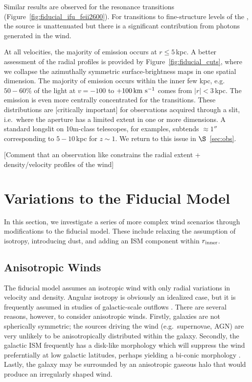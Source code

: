 \documentclass[12pt,preprint]{aastex}
\begin{document}
Similar results are observed for the  resonance
transitions (Figure~\ref{fig:fiducial_ifu_feii2600}).
For transitions to fine-structure levels of the \aconfig, the source
is unattenuated but there is a significant contribution from photons
generated in the wind. 

At all velocities, the majority of emission occurs at $r \le 5$\,kpc.
A better assessment of the radial profiles is provided by
Figure~\ref{fig:fiducial_cuts}, where we collapse the 
azimuthally symmetric surface-brightness maps in
one spatial dimension.  The majority of
 emission occurs within the inner few kpc, e.g.\ $50-60\%$
of the light at $v=-100$ to $+100 \, {\rm km~s^{-1}}$
comes from $|r| < 3$\,kpc.
The emission
is even more centrally concentrated for the  transitions.
These distributions are [critically important] for observations
acquired through a slit, i.e.\ where the aperture has a limited extent
in one or more dimensions.  A standard longslit on 10m-class
telescopes, for examples, subtends $\approx 1''$ corresponding to
$5-10$\,kpc for $z \sim 1$.    We return to this issue in
$\S$~\ref{sec:obs}. 

[Comment that an observation like constrains the radial extent +
density/velocity profiles of the wind]


\section{Variations to the Fiducial Model}

In this section, we investigate a series of more complex wind
scenarios
through modifications to the fiducial model.  These include relaxing
the assumption of isotropy, introducing dust, and adding an ISM
component within $r_{\rm inner}$.

\subsection{Anisotropic Winds}
\label{sec:anisotropic}

The fiducial model assumes an
isotropic wind with only radial variations in velocity and density. 
Angular isotropy is obviously an idealized case, but
it is frequently assumed in studies of galactic-scale outflows
\citep[e.g.][]{steidel+10}.   There are several reasons, however, to
consider anisotropic winds.  Firstly, galaxies are not spherically
symmetric;  the sources driving the
wind (e.g.\ supernovae, AGN) are very unlikely to be anisotropically distributed
within the galaxy.  
Secondly, the galactic ISM frequently has a disk-like morphology
which will suppress the wind preferntially at low galactic latitudes,
perhaps yielding a bi-conic morphology \citep[e.g.][]{M87}.
Lastly, the galaxy may be surrounded by an
anisotropic gaseous halo that would produce an irregularly shaped
wind.
\end{document}
